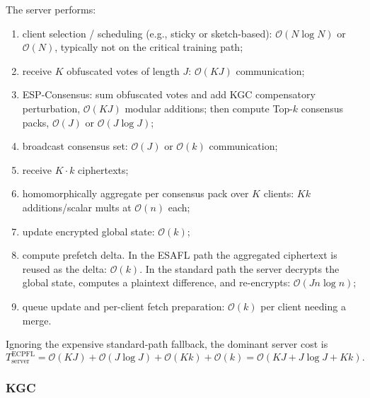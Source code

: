 \documentclass[a4paper,11pt]{article}
\begin{document}
The server performs:
\begin{enumerate}
    \item client selection / scheduling (e.g., sticky or sketch-based): $\mathcal{O}(N\log N)$ or $\mathcal{O}(N)$, typically not on the critical training path;
    \item receive $K$ obfuscated votes of length $J$: $\mathcal{O}(KJ)$ communication;
    \item ESP-Consensus: sum obfuscated votes and add KGC compensatory perturbation, $\mathcal{O}(KJ)$ modular additions; then compute Top-$k$ consensus packs, $\mathcal{O}(J)$ or $\mathcal{O}(J\log J)$;
    \item broadcast consensus set: $\mathcal{O}(J)$ or $\mathcal{O}(k)$ communication;
    \item receive $K\cdot k$ ciphertexts;
    \item homomorphically aggregate per consensus pack over $K$ clients: $Kk$ additions/scalar mults at $\mathcal{O}(n)$ each;
    \item update encrypted global state: $\mathcal{O}(k)$;
    \item compute prefetch delta. In the ESAFL path the aggregated ciphertext is reused as the delta: $\mathcal{O}(k)$. In the standard path the server decrypts the global state, computes a plaintext difference, and re-encrypts: $\mathcal{O}(J n\log n)$;
    \item queue update and per-client fetch preparation: $\mathcal{O}(k)$ per client needing a merge.
\end{enumerate}
Ignoring the expensive standard-path fallback, the dominant server cost is
\begin{equation}
\boxed{T_{\text{server}}^{\text{ECPFL}} = \mathcal{O}(KJ) + \mathcal{O}(J\log J) + \mathcal{O}(Kk) + \mathcal{O}(k) = \mathcal{O}(KJ + J\log J + Kk).}
\end{equation}

\subsubsection{KGC}
\label{sssec:ecpfl-kgc}
\end{document}
